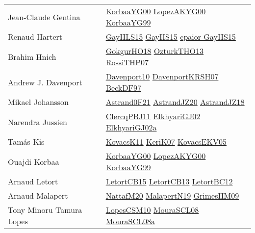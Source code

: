 {\begin{longtable}{p{4cm}p{20cm}}
Jean{-}Claude Gentina & \href{articles/KorbaaYG00.pdf}{KorbaaYG00}\cite{KorbaaYG00} \href{articles/LopezAKYG00.pdf}{LopezAKYG00}\cite{LopezAKYG00} \href{papers/KorbaaYG99.pdf}{KorbaaYG99}\cite{KorbaaYG99} \\
Renaud Hartert & \href{papers/GayHLS15.pdf}{GayHLS15}\cite{GayHLS15} \href{papers/GayHS15.pdf}{GayHS15}\cite{GayHS15} \href{papers/cpaior-GayHS15.pdf}{cpaior-GayHS15}\cite{cpaior-GayHS15} \\
Brahim Hnich & \href{}{GokgurHO18}\cite{GokgurHO18} \href{articles/OzturkTHO13.pdf}{OzturkTHO13}\cite{OzturkTHO13} \href{papers/RossiTHP07.pdf}{RossiTHP07}\cite{RossiTHP07} \\
Andrew J. Davenport & \href{papers/Davenport10.pdf}{Davenport10}\cite{Davenport10} \href{papers/DavenportKRSH07.pdf}{DavenportKRSH07}\cite{DavenportKRSH07} \href{papers/BeckDF97.pdf}{BeckDF97}\cite{BeckDF97} \\
Mikael Johansson & \href{papers/Astrand0F21.pdf}{Astrand0F21}\cite{Astrand0F21} \href{articles/AstrandJZ20.pdf}{AstrandJZ20}\cite{AstrandJZ20} \href{papers/AstrandJZ18.pdf}{AstrandJZ18}\cite{AstrandJZ18} \\
Narendra Jussien & \href{papers/ClercqPBJ11.pdf}{ClercqPBJ11}\cite{ClercqPBJ11} \href{papers/ElkhyariGJ02.pdf}{ElkhyariGJ02}\cite{ElkhyariGJ02} \href{papers/ElkhyariGJ02a.pdf}{ElkhyariGJ02a}\cite{ElkhyariGJ02a} \\
Tam{\'{a}}s Kis & \href{articles/KovacsK11.pdf}{KovacsK11}\cite{KovacsK11} \href{papers/KeriK07.pdf}{KeriK07}\cite{KeriK07} \href{papers/KovacsEKV05.pdf}{KovacsEKV05}\cite{KovacsEKV05} \\
Ouajdi Korbaa & \href{articles/KorbaaYG00.pdf}{KorbaaYG00}\cite{KorbaaYG00} \href{articles/LopezAKYG00.pdf}{LopezAKYG00}\cite{LopezAKYG00} \href{papers/KorbaaYG99.pdf}{KorbaaYG99}\cite{KorbaaYG99} \\
Arnaud Letort & \href{articles/LetortCB15.pdf}{LetortCB15}\cite{LetortCB15} \href{papers/LetortCB13.pdf}{LetortCB13}\cite{LetortCB13} \href{papers/LetortBC12.pdf}{LetortBC12}\cite{LetortBC12} \\
Arnaud Malapert & \href{papers/NattafM20.pdf}{NattafM20}\cite{NattafM20} \href{papers/MalapertN19.pdf}{MalapertN19}\cite{MalapertN19} \href{papers/GrimesHM09.pdf}{GrimesHM09}\cite{GrimesHM09} \\
Tony Minoru Tamura Lopes & \href{articles/LopesCSM10.pdf}{LopesCSM10}\cite{LopesCSM10} \href{papers/MouraSCL08.pdf}{MouraSCL08}\cite{MouraSCL08} \href{papers/MouraSCL08a.pdf}{MouraSCL08a}\cite{MouraSCL08a} \\

\end{longtable}}
